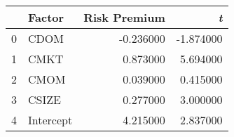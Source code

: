 \begin{tabular}{llrr}
\toprule
 & Factor & Risk Premium & \emph{t} \\
\midrule
0 & CDOM & -0.236000 & -1.874000 \\
1 & CMKT & 0.873000 & 5.694000 \\
2 & CMOM & 0.039000 & 0.415000 \\
3 & CSIZE & 0.277000 & 3.000000 \\
4 & Intercept & 4.215000 & 2.837000 \\
\bottomrule
\end{tabular}
